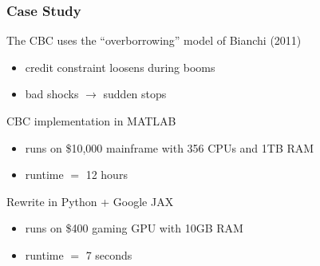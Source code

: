 \begin{frame}
    \frametitle{Case Study}

    The CBC uses the ``overborrowing'' model of Bianchi (2011)

    \begin{itemize}
        \item credit constraint loosens during booms
        \item bad shocks $\to$ sudden stops
    \end{itemize}

    \vspace{0.5em}
    CBC implementation in MATLAB 

    \begin{itemize}
        \item runs on \$10,000 mainframe with 356 CPUs and 1TB RAM
        \item runtime $=$ 12 hours
    \end{itemize}

    \pause
    \vspace{0.5em}
    Rewrite in Python + Google JAX

    \begin{itemize}
        \item runs on \$400 gaming GPU with 10GB RAM
        \item runtime $=$ 7 seconds
    \end{itemize}


\end{frame}

